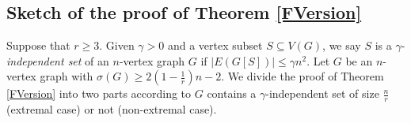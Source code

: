 \documentclass[11pt, a4paper]{article}
\theoremstyle{definition}
\newcommand{\<}{\subseteq}
\begin{document}


\subsection{Sketch of the proof of Theorem \ref{FVersion}}

Suppose that $r\ge 3$. Given $\gamma>0$ and  a vertex subset $S\subseteq V(G)$, we say $S$ is a $\gamma$-\textit{independent set} of an $n$-vertex graph $G$ if $|E(G[S])|\leq \gamma n^2$. Let $G$ be an $n$-vertex graph with $\sigma(G)\geq 2(1-\frac{1}{r})n-2$. We divide the proof of Theorem \ref{FVersion} into two parts according to $G$ contains a $\gamma$-independent set of size $\frac{n}{r}$ (extremal case) or not (non-extremal case). 
\end{document}
